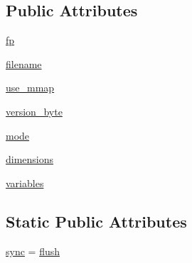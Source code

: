 \subsection*{Public Attributes}
\begin{DoxyCompactItemize}
\item 
\hyperlink{classscipy_1_1io_1_1netcdf_1_1netcdf__file_ac6246de7714c9e88aa1af053a5e3ddc8}{fp}
\item 
\hyperlink{classscipy_1_1io_1_1netcdf_1_1netcdf__file_a72a09f7b8b72c704397d0b22754d1904}{filename}
\item 
\hyperlink{classscipy_1_1io_1_1netcdf_1_1netcdf__file_ab30b03bd27bc485d38eee32d9957fe49}{use\+\_\+mmap}
\item 
\hyperlink{classscipy_1_1io_1_1netcdf_1_1netcdf__file_ad50eb4214bad62a9bf838037d5dada96}{version\+\_\+byte}
\item 
\hyperlink{classscipy_1_1io_1_1netcdf_1_1netcdf__file_adcb6d058997c5f643328a771a9c53205}{mode}
\item 
\hyperlink{classscipy_1_1io_1_1netcdf_1_1netcdf__file_aeb75065359ca8134a53c7c502175fbd7}{dimensions}
\item 
\hyperlink{classscipy_1_1io_1_1netcdf_1_1netcdf__file_a27345ed6ed8853159164b0d00e3369a4}{variables}
\end{DoxyCompactItemize}
\subsection*{Static Public Attributes}
\begin{DoxyCompactItemize}
\item 
\hyperlink{classscipy_1_1io_1_1netcdf_1_1netcdf__file_a208e2f07e49f9734873a2e52ead72fd1}{sync} = \hyperlink{classscipy_1_1io_1_1netcdf_1_1netcdf__file_a8cf81ee24b252c20be8f13dbedb707e7}{flush}
\end{DoxyCompactItemize}


